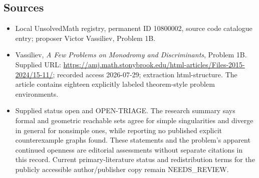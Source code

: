\documentclass[11pt]{article}
\begin{document}
\subsection{Sources}
\begin{itemize}
\item Local UnsolvedMath registry, permanent ID 10800002, source code catalogue entry; proposer Victor Vassiliev, Problem 1B.
\item Vassiliev, \emph{A Few Problems on Monodromy and Discriminants}, Problem 1B. Supplied URL: \url{https://amj.math.stonybrook.edu/html-articles/Files-2015-2024/15-11/}; recorded access 2026-07-29; extraction html-structure. The article contains eighteen explicitly labeled theorem-style problem environments.
\item Supplied status open and OPEN-TRIAGE. The research summary says formal and geometric reachable sets agree for simple singularities and diverge in general for nonsimple ones, while reporting no published explicit counterexample graphs found. These statements and the problem's apparent continued openness are editorial assessments without separate citations in this record. Current primary-literature status and redistribution terms for the publicly accessible author/publisher copy remain NEEDS\_REVIEW.
\end{itemize}
\end{document}
